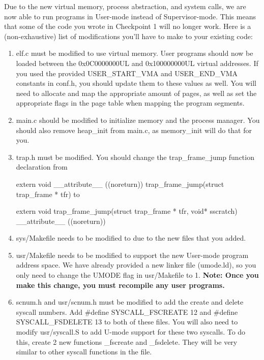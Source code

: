 \documentclass{article}
\begin{document}
		Due to the new virtual memory, process abstraction, and system calls, we are now able to run programs in User-mode instead of Supervisor-mode. This means
		that some of the code you wrote in Checkpoint 1 will no longer work. Here is a (non-exhaustive) list of modifications you'll have to make to your existing code:
		\begin{enumerate}
			\item{\fix elf.c} must be modified to use virtual memory. User programs should now be loaded between the {\fix 0x0C0000000UL}
			and {\fix 0x100000000UL} virtual addresses. If you used the provided {\fix USER\_START\_VMA} and {\fix USER\_END\_VMA} constants in {\fix conf.h}, you should
            update them to these values as well. You will need to allocate and map the appropriate amount of pages, as well
			as set the appropriate flags in the page table when mapping the program segments.

			\item{\fix main.c} should be modified to initialize memory and the process manager. You should also remove {\fix heap\_init} from main.c, as {\fix memory\_init} will do that for you. 
			
			\item{\fix trap.h} must be modified. You should change the {\fix trap\_frame\_jump} function declaration from
			
			{\fix extern void \_\_attribute\_\_ ((noreturn)) trap\_frame\_jump(struct trap\_frame * tfr)} to
			
			{\fix extern void trap\_frame\_jump(struct trap\_frame * tfr, void* sscratch) \_\_attribute\_\_ ((noreturn))}

			\item{\fix sys/Makefile} needs to be modified to due to the new files that you added.
		
            \item{\fix usr/Makefile} needs to be modified to support the new User-mode program address space. We have already provided a new linker file ({\fix umode.ld}), so 
            you only need to change the {\fix UMODE} flag in {\fix usr/Makefile} to 1. \textbf{Note: Once you make this change, you must recompile any user programs.}

			\item{\fix scnum.h} and {\fix usr/scnum.h} must be modified to add the create and delete syscall numbers. Add {\fix \#define SYSCALL\_FSCREATE 12} and {\fix \#define SYSCALL\_FSDELETE 13}
			to both of these files. You will also need to modify {\fix usr/syscall.S} to add U-mode support for these two syscalls. To do this, create 2 new functions {\fix \_fscreate} and {\fix \_fsdelete}. They
			will be very similar to other syscall functions in the file.


\end{enumerate}
\end{document}
